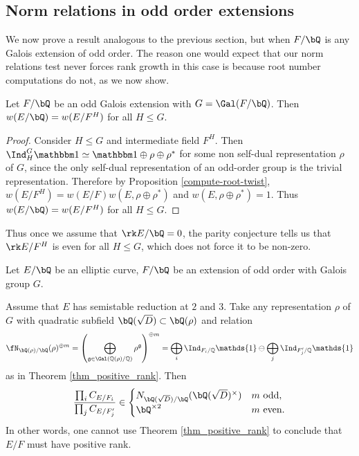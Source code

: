 \subsection{Norm relations in odd order extensions}

We now prove a result analogous to the previous section, but when $F / \bQ$ is any Galois extension of odd order. The reason one would expect that our norm relations test never forces rank growth in this case is because root number computations do not, as we now show.

\begin{lemma}
 Let $F / \bQ$ be an odd Galois extension with $G = \Gal(F / \bQ)$. Then $w(E / \bQ) = w(E / F^H)$ for all $H \leq G$. 
\end{lemma}

\begin{proof}
Consider $H \leq G$ and intermediate field $F^H$. Then 
$\Ind_H^G \trivial \simeq \trivial \oplus 
\rho \oplus \rho^*$ for some non self-dual representation $\rho$ of $G$, since the only self-dual representation of an odd-order group is the trivial representation. Therefore by Proposition \ref{compute-root-twist}, $w(E / F^H) = w(E / F)w(E, \rho \oplus \rho^*)$ and $w(E, \rho \oplus \rho^*) = 1$. Thus $w(E / \bQ) = w(E / F^H)$ for all $H \leq G$. 
\end{proof}

Thus once we assume that $\rk E / \bQ = 0$, the parity conjecture tells us that $\rk E / F^H$ is even for all $H \leq G$, which does not force it to be non-zero. 


\begin{thm}\label{odd-exts}
 Let $E / \bQ$ be an elliptic curve, $F / \bQ$ be an extension of odd order with Galois group $G$. 
 
Assume that $E$ has semistable reduction at $2$ and $3$. 
Take any representation $\rho$ of $G$ with quadratic subfield $\bQ(\sqrt{D}) \subset \bQ(\rho)$ and relation
\begin{equation*}\label{odd-exp} \repnorm{\rho}^{\oplus m} =
 \left(\bigoplus_{\mathfrak{g}\in\Gal(\QQ(\rho)/\QQ)}\rho^{\mathfrak{g}}\right)^{\oplus m }=\bigoplus_i\Ind_{F_i/\QQ}\mathds{1}\ominus\bigoplus_j\Ind_{F'_j/\QQ}\mathds{1}
\end{equation*}
 as in Theorem \ref{thm_positive_rank}. Then
 \[ \frac{\prod_i C_{E/F_i}}{\prod_j C_{E/F_j'}}  \in 
    \begin{cases}
        N_{\bQ(\sqrt{D}) / \bQ}(\bQ(\sqrt{D})^{\times}) & m \ \text{odd}, \\
        \bQ^{\times 2} & m \ \text{even}.
    \end{cases} \] 
    In other words, one cannot use Theorem \ref{thm_positive_rank} to conclude that $E / F$ must have positive rank. 
\end{thm}

